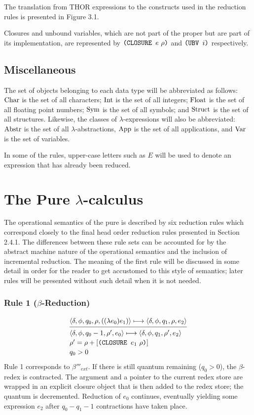 The translation from THOR expressions to the constructs used in the reduction
rules is presented in Figure 3.1.

Closures and unbound variables, which are not part of the \lambdacalculus{}
proper but are part of its implementation, are represented by \(\texttt{(CLOSURE }e\ \rho\texttt{)}\) and \(\texttt{(UBV }i\texttt{)}\) respectively.

\subsection{Miscellaneous}

The set of objects belonging to each data type will be abbreviated as follows:
\(\operatorname{Char}\) is the set of all characters; \(\operatorname{Int}\) is the set of all integers;
\(\operatorname{Float}\) is the set of all floating point numbers; \(\operatorname{Sym}\) is the set of all
symbols; and \(\operatorname{Struct}\) is the set of all structures. Likewise, the classes of
\(\lambda\)-expressions will also be abbreviated: \(\operatorname{Abstr}\) is the set of all
\(\lambda\)-abstractions, \(\operatorname{App}\) is the set of all applications, and \(\operatorname{Var}\)
is the set of variables.

In some of the rules, upper-case letters such as \(E\) will be used to denote an
expression that has already been reduced.

\section{The Pure \(\lambda\)-calculus}

The operational semantics of the pure \lambdacalculus{} is described by six
reduction rules which correspond closely to the final head order reduction rules
presented in Section 2.4.1. The differences between these rule sets can be
accounted for by the abstract machine nature of the operational semantics and
the inclusion of incremental reduction. The meaning of the first rule will be
discussed in some detail in order for the reader to get accustomed to this style
of semantics; later rules will be presented without such detail when it is not
needed.

\subsubsection*{Rule 1 (\(\beta\)-Reduction)}
\[
\semanticrule{
\cfg{\delta}{\phi}{q_0}{\rho}{((\lambda e_0)e_1)}\redsto
  \cfg{\delta}{\phi}{q_1}{\rho}{e_2}
}{
\cfg{\delta}{\phi}{q_0-1}{\rho'}{e_0}\redsto
  \cfg{\delta}{\phi}{q_1}{\rho'}{e_2}\\
\rho'=\rho+[\THOR{(CLOSURE }e_1\ \rho\THOR{)}]\\ q_0>0
}
\]
Rule 1 corresponds to \(\beta'''_{ext}\). If there is still quantum remaining
(\(q_0>0\)), the \(\beta\)-redex is contracted. The argument and a pointer to
the current redex store are wrapped in an explicit closure object that is then
added to the redex store; the quantum is decremented. Reduction of \(e_0\)
continues, eventually yielding some expression \(e_2\) after
\(q_0-q_1-1\) contractions have taken place.

